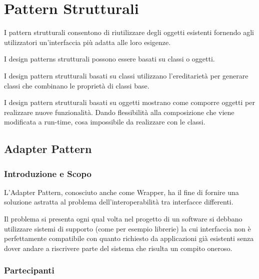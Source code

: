 \chapter{Pattern Strutturali}

I pattern strutturali consentono di riutilizzare degli oggetti 
esistenti fornendo agli utilizzatori un'interfaccia più adatta alle 
loro esigenze.

I design patterns strutturali possono essere basati su classi o oggetti.

I design pattern strutturali basati su classi utilizzano l’ereditarietà 
per generare classi che combinano le proprietà di classi base.

I design pattern strutturali basati su oggetti mostrano come comporre 
oggetti per realizzare nuove funzionalità. 
Dando flessibilità alla composizione che viene modificata a run-time, 
cosa impossibile da realizzare con le classi.

  \section{Adapter Pattern}
  
    \subsection{Introduzione e Scopo}
    
    L'Adapter Pattern, conosciuto anche come Wrapper, ha il fine di fornire
    una soluzione astratta al problema dell'interoperabilità tra interfacce 
    differenti.
    
    Il problema si presenta ogni qual volta nel progetto di un software 
    si debbano utilizzare sistemi di supporto (come per esempio librerie) 
    la cui interfaccia non è perfettamente compatibile con quanto richiesto 
    da applicazioni già esistenti senza dover andare a riscrivere 
    parte del sistema che risulta un compito oneroso.
    
    \subsection{Partecipanti}
    

